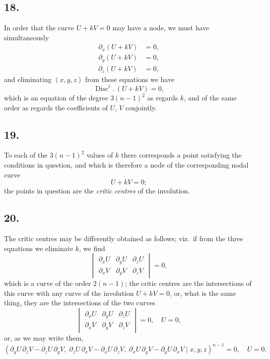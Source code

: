 \documentclass[11pt,a4paper]{article}
\theoremstyle{definition}
\DeclareMathOperator{\Disc}{Disc}
\begin{document}
\subsection*{18.}

In order that the curve $U + kV = 0$ may have a node, we must have simultaneously
\begin{align*}
\partial_{x}(U + kV) &= 0,\\
\partial_{y}(U + kV) &= 0,\\
\partial_{z}(U + kV) &= 0,
\end{align*}
and eliminating $(x, y, z)$ from these equations we have
\[
\Disc^{t}.\ (U + kV) = 0,
\]
which is an equation of the degree $3(n - 1)^{2}$ as regards $k$, and of the same order as
regards the coefficients of $U$, $V$ conjointly.

\subsection*{19.}

To each of the $3(n - 1)^{2}$ values of $k$ there corresponds a point satisfying the conditions
in question, and which is therefore a node of the corresponding nodal curve
\[
U + kV = 0;
\]
the points in question are the \textit{critic centres} of the involution.

\subsection*{20.}

The critic centres may be differently obtained as follows; viz.\ if from the three
equations we eliminate $k$, we find
\[
\begin{vmatrix}
\partial_{x}U & \partial_{y}U & \partial_{z}U \\
\partial_{x}V & \partial_{y}V & \partial_{z}V
\end{vmatrix}
= 0,
\]
which is a curve of the order $2(n - 1)$; the critic centres are the intersections of this
curve with any curve of the involution $U + kV = 0$, or, what is the same thing, they
are the intersections of the two curves
\[
\begin{vmatrix}
\partial_{x}U & \partial_{y}U & \partial_{z}U \\
\partial_{x}V & \partial_{y}V & \partial_{z}V
\end{vmatrix}
= 0,\quad U = 0,
\]
or, as we may write them,
\[
(\partial_{y}U\,\partial_{z}V - \partial_{z}U\,\partial_{y}V,\;
 \partial_{z}U\,\partial_{x}V - \partial_{x}U\,\partial_{z}V,\;
 \partial_{x}U\,\partial_{y}V - \partial_{y}U\,\partial_{x}V \mid x, y, z)^{n-1} = 0,\quad U = 0.
\]
\end{document}
